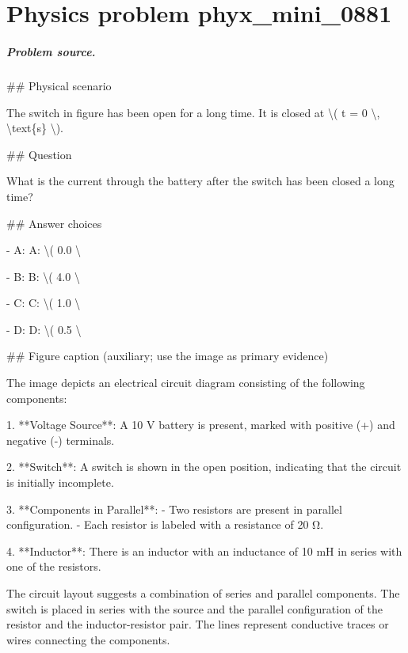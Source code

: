 
\chapter{Physics problem phyx\_mini\_0881}
\label{ch:PhyXMiniProblems_problem_phyx_mini_0881}

\paragraph{Problem source.}
\#\# Physical scenario

The switch in figure has been open for a long time. It is closed at \textbackslash{}( t = 0 \textbackslash{}, \textbackslash{}text\{s\} \textbackslash{}).

\#\# Question

What is the current through the battery after the switch has been closed a long time?

\#\# Answer choices

- A: A: \textbackslash{}( 0.0 \textbackslash{}

- B: B: \textbackslash{}( 4.0 \textbackslash{}

- C: C: \textbackslash{}( 1.0 \textbackslash{}

- D: D: \textbackslash{}( 0.5 \textbackslash{}

\#\# Figure caption (auxiliary; use the image as primary evidence)

The image depicts an electrical circuit diagram consisting of the following components:

1. **Voltage Source**: A 10 V battery is present, marked with positive (+) and negative (-) terminals.

2. **Switch**: A switch is shown in the open position, indicating that the circuit is initially incomplete.

3. **Components in Parallel**:
   - Two resistors are present in parallel configuration.
   - Each resistor is labeled with a resistance of 20 Ω.

4. **Inductor**: There is an inductor with an inductance of 10 mH in series with one of the resistors.

The circuit layout suggests a combination of series and parallel components. The switch is placed in series with the source and the parallel configuration of the resistor and the inductor-resistor pair. The lines represent conductive traces or wires connecting the components.

